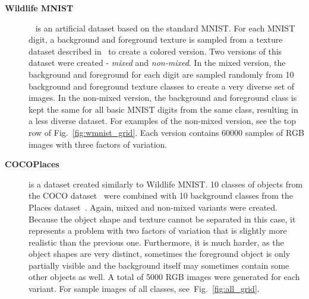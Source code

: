 \begin{description}
    \item[\textbf{Wildlife MNIST}]~\cite{sauer2021counterfactual} is an artificial dataset based on the standard MNIST. For each MNIST digit, a background and foreground texture is sampled from a texture dataset described in~\cite{cimpoi2014describing} to create a colored version. Two versions of this dataset were created - \textit{mixed} and \textit{non-mixed}. In the mixed version, the background and foreground for each digit are sampled randomly from 10 background and foreground texture classes to create a very diverse set of images. In the non-mixed version, the background and foreground class is kept the same for all basic MNIST digits from the same class, resulting in a less diverse dataset. For examples of the non-mixed version, see the top row of Fig.~\ref{fig:wmnist_grid}. Each version contains 60000 samples of RGB images with three factors of variation.
    
    \item[\textbf{COCOPlaces}] is a dataset created similarly to Wildlife MNIST. 10 classes of objects from the COCO dataset~\cite{lin2014microsoft} were combined with 10 background classes from the Places dataset~\cite{zhou2017places}. Again, mixed and non-mixed variants were created. Because the object shape and texture cannot be separated in this case, it represents a problem with two factors of variation that is slightly more realistic than the previous one. Furthermore, it is much harder, as the object shapes are very distinct, sometimes the foreground object is only partially visible and the background itself may sometimes contain some other objects as well. A total of 5000 RGB images were generated for each variant. For sample images of all classes, see~Fig.~\ref{fig:all_grid}.
\end{description}

